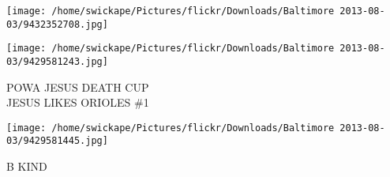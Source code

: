 \documentclass[10pt,letterpaper]{article}
\begin{document}
\texttt{[image: /home/swickape/Pictures/flickr/Downloads/Baltimore 2013-08-03/9432352708.jpg]}

\vspace{0.25in}
\texttt{[image: /home/swickape/Pictures/flickr/Downloads/Baltimore 2013-08-03/9429581243.jpg]}

POWA JESUS DEATH CUP\\
JESUS LIKES ORIOLES \#1\\
\pagebreak

\texttt{[image: /home/swickape/Pictures/flickr/Downloads/Baltimore 2013-08-03/9429581445.jpg]}

B KIND\\
\pagebreak
\end{document}

